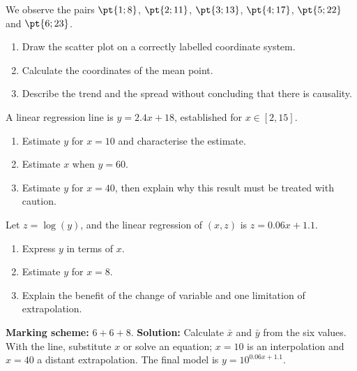 \begin{exercise}
We observe the pairs $\pt{1;8}$, $\pt{2;11}$, $\pt{3;13}$, $\pt{4;17}$, $\pt{5;22}$ and $\pt{6;23}$.
\begin{enumerate}
\item Draw the scatter plot on a correctly labelled coordinate system.
\item Calculate the coordinates of the mean point.
\item Describe the trend and the spread without concluding that there is causality.
\end{enumerate}
\end{exercise}
\begin{exercise}
A linear regression line is $y=\num{2,4}x+18$, established for $x\in[2,15]$.
\begin{enumerate}
\item Estimate $y$ for $x=10$ and characterise the estimate.
\item Estimate $x$ when $y=60$.
\item Estimate $y$ for $x=40$, then explain why this result must be treated with caution.
\end{enumerate}
\end{exercise}
\begin{exercise}
Let $z=\log(y)$, and the linear regression of $(x,z)$ is $z=\num{0,06}x+\num{1,1}$.
\begin{enumerate}
\item Express $y$ in terms of $x$.
\item Estimate $y$ for $x=8$.
\item Explain the benefit of the change of variable and one limitation of extrapolation.
\end{enumerate}
\end{exercise}
\begin{solution}\textbf{Marking scheme:} $6+6+8$. \textbf{Solution:} Calculate $\bar x$ and $\bar y$ from the six values. With the line, substitute $x$ or solve an equation; $x=10$ is an interpolation and $x=40$ a distant extrapolation. The final model is $y=10^{\num{0,06}x+\num{1,1}}$.\end{solution}

